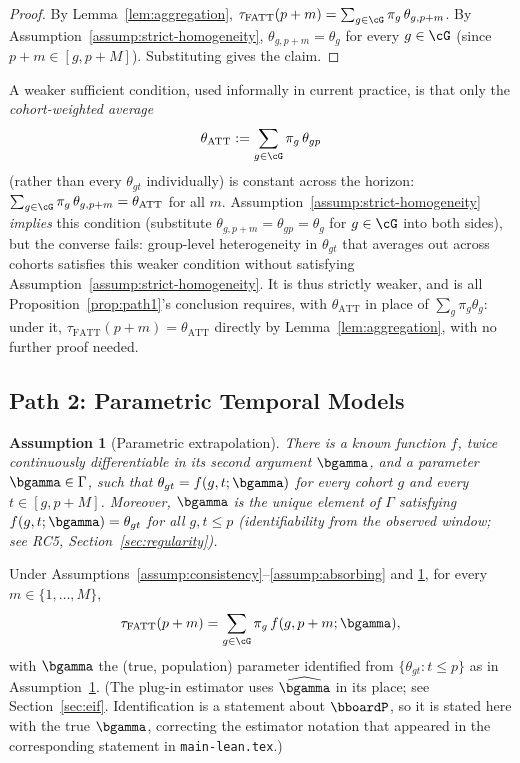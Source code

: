 \documentclass{article}
\renewcommand{\P}{\bboardP}
\newtheorem{assumption}{Assumption}
\begin{document}
\begin{proof}
By Lemma~\ref{lem:aggregation}, $\tau_{\mathrm{FATT}}(p+m) = \sum_{g \in \cG} \pi_g\, \theta_{g,p+m}$. By Assumption~\ref{assump:strict-homogeneity}, $\theta_{g,p+m} = \theta_g$ for every $g \in \cG$ (since $p+m \in [g,p+M]$). Substituting gives the claim.
\end{proof}

\begin{remark}
\label{rem:aggregate-homogeneity}
A weaker sufficient condition, used informally in current practice, is that only the \emph{cohort-weighted average}
\[
\theta_{\mathrm{ATT}} := \sum_{g\in\cG}\pi_g\,\theta_{gp}
\]
(rather than every $\theta_{gt}$ individually) is constant across the horizon: $\sum_{g\in\cG}\pi_g\,\theta_{g,p+m} = \theta_{\mathrm{ATT}}$ for all $m$. Assumption~\ref{assump:strict-homogeneity} \emph{implies} this condition (substitute $\theta_{g,p+m}=\theta_{gp}=\theta_g$ for $g\in\cG$ into both sides), but the converse fails: group-level heterogeneity in $\theta_{gt}$ that averages out across cohorts satisfies this weaker condition without satisfying Assumption~\ref{assump:strict-homogeneity}. It is thus strictly weaker, and is all Proposition~\ref{prop:path1}'s conclusion requires, with $\theta_{\mathrm{ATT}}$ in place of $\sum_{g}\pi_g\theta_g$: under it, $\tau_{\mathrm{FATT}}(p+m) = \theta_{\mathrm{ATT}}$ directly by Lemma~\ref{lem:aggregation}, with no further proof needed.
\end{remark}

\subsection{Path 2: Parametric Temporal Models}

\begin{assumption}[Parametric extrapolation]
\label{assump:parametric}
There is a known function $f$, twice continuously differentiable in its second argument $\bgamma$, and a parameter $\bgamma \in \Gamma$, such that $\theta_{gt} = f(g,t;\bgamma)$ for every cohort $g$ and every $t \in [g,p+M]$. Moreover, $\bgamma$ is the unique element of $\Gamma$ satisfying $f(g,t;\bgamma) = \theta_{gt}$ for all $g,t\leq p$ (identifiability from the observed window; see RC5, Section~\ref{sec:regularity}).
\end{assumption}

\begin{proposition}
\label{prop:path2}
Under Assumptions~\ref{assump:consistency}--\ref{assump:absorbing} and \ref{assump:parametric}, for every $m \in \{1,\ldots,M\}$,
\[
\tau_{\mathrm{FATT}}(p+m) = \sum_{g \in \cG} \pi_g\, f(g,p+m;\bgamma),
\]
with $\bgamma$ the (true, population) parameter identified from $\{\theta_{gt} : t \leq p\}$ as in Assumption~\ref{assump:parametric}. (The plug-in estimator uses $\widehat{\bgamma}$ in its place; see Section~\ref{sec:eif}. Identification is a statement about $\P$, so it is stated here with the true $\bgamma$, correcting the estimator notation that appeared in the corresponding statement in \texttt{main-lean.tex}.)
\end{proposition}
\end{document}
